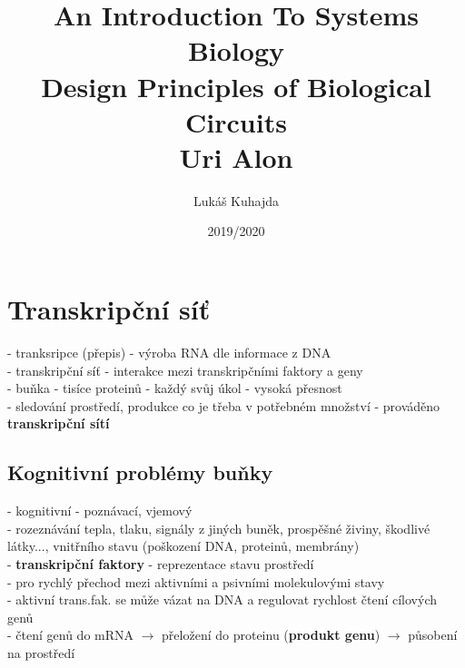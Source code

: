 \documentclass[11pt,a4paper]{report}
\begin{document}
\begin{huge}
\title{\Huge{An Introduction To Systems Biology\\Design Principles of Biological Circuits\\Uri Alon}}
\author{Lukáš Kuhajda}
\date{2019/2020}
\maketitle
\end{huge}

\newpage

\chapter{Transkripční síť}
- tranksripce (přepis) - výroba RNA dle informace z DNA\\
- transkripční síť - interakce mezi transkripčními faktory a geny\\
- buňka - tisíce proteinů - každý svůj úkol - vysoká přesnost\\
\indent - sledování prostředí, produkce co je třeba v potřebném množství - prováděno \textbf{transkripční sítí}\\

\section{Kognitivní problémy buňky}
- kognitivní - poznávací, vjemový\\
- rozeznávání tepla, tlaku, signály z jiných buněk, prospěšné živiny, škodlivé látky..., vnitřního stavu (poškození DNA, proteinů, membrány)\\
- \textbf{transkripční faktory} - reprezentace stavu prostředí\\
\indent - pro rychlý přechod mezi aktivními a psivními molekulovými stavy\\
\indent - aktivní trans.fak. se může vázat na DNA a regulovat rychlost čtení cílových genů\\
\indent - čtení genů do mRNA $\rightarrow$ přeložení do proteinu (\textbf{produkt genu}) $\rightarrow$ působení na prostředí\\
\end{document}
